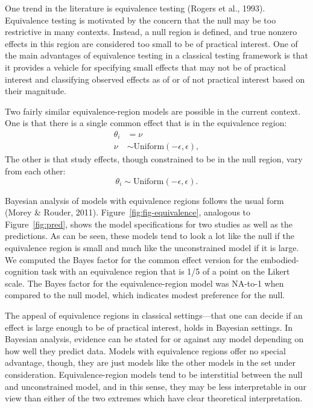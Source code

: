 \documentclass[english,man]{apa6}
\theoremstyle{definition}
\theoremstyle{definition}
\theoremstyle{remark}
\begin{document}
One trend in the literature is equivalence testing (Rogers et al.,
1993). Equivalence testing is motivated by the concern that the null may
be too restrictive in many contexts. Instead, a null region is defined,
and true nonzero effects in this region are considered too small to be
of practical interest. One of the main advantages of equivalence testing
in a classical testing framework is that it provides a vehicle for
specifying small effects that may not be of practical interest and
classifying observed effects as of or of not practical interest based on
their magnitude.

Two fairly similar equivalence-region models are possible in the current
context. One is that there is a single common effect that is in the
equivalence region:\\
\[
\begin{aligned}
\theta_i &= \nu\\
\nu &\sim \mbox{Uniform}(-\epsilon,\epsilon),
\end{aligned}
\] The other is that study effects, though constrained to be in the null
region, vary from each other: \[
\theta_i \sim \mbox{Uniform}(-\epsilon,\epsilon).
\]

Bayesian analysis of models with equivalence regions follows the usual
form (Morey \& Rouder, 2011). Figure~\ref{fig:fig-equivalence},
analogous to Figure~\ref{fig:pred}, shows the model specifications for
two studies as well as the predictions. As can be seen, these models
tend to look a lot like the null if the equivalence region is small and
much like the unconstrained model if it is large. We computed the Bayes
factor for the common effect version for the embodied-cognition task
with an equivalence region that is 1/5 of a point on the Likert scale.
The Bayes factor for the equivalence-region model was NA-to-1 when
compared to the null model, which indicates modest preference for the
null.

The appeal of equivalence regions in classical settings---that one can
decide if an effect is large enough to be of practical interest, holds
in Bayesian settings. In Bayesian analysis, evidence can be stated for
or against any model depending on how well they predict data. Models
with equivalence regions offer no special advantage, though, they are
just models like the other models in the set under consideration.
Equivalence-region models tend to be interstitial between the null and
unconstrained model, and in this sense, they may be less interpretable
in our view than either of the two extremes which have clear theoretical
interpretation.
\end{document}
